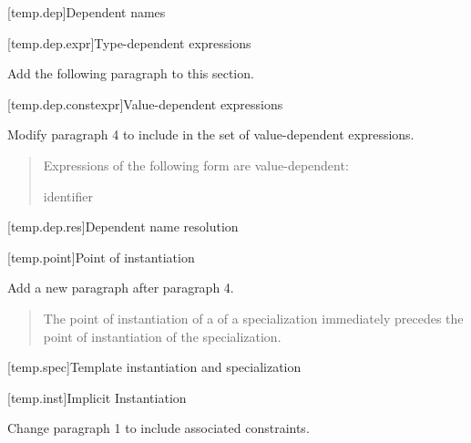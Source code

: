 \setcounter{subsection}{1}
[temp.dep]{Dependent names}

\setcounter{subsubsection}{1}
[temp.dep.expr]{Type-dependent expressions}

Add the following paragraph to this section.

\begin{quote}
\setcounter{Paras}{6}
\pnum
{}
\end{quote}

[temp.dep.constexpr]{Value-dependent expressions}

Modify paragraph 4 to include  in
the set of value-dependent expressions.

\begin{quote}
\setcounter{Paras}{3}
\pnum
Expressions of the following form are value-dependent:

\begin{ncbnftab}
  \terminal{(} identifier \terminal{)}\br
{}
\end{ncbnftab}
\end{quote}


\setcounter{subsection}{3}
[temp.dep.res]{Dependent name resolution}

[temp.point]{Point of instantiation}

Add a new paragraph after paragraph 4.

\begin{quote}
\setcounter{Paras}{4}
\begin{addedblock}
\pnum
The point of instantiation of a  of a
specialization immediately precedes the point of instantiation of
the specialization.
\end{addedblock}
\end{quote}


[temp.spec]{Template instantiation and specialization}

[temp.inst]{Implicit Instantiation}
    
Change paragraph 1 to include associated constraints.

